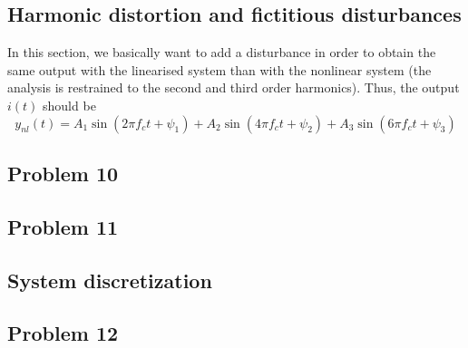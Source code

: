 \documentclass[12pt,a4paper,fleqn, onesside]{report}
\begin{document}
\subsection{Harmonic distortion and fictitious disturbances}
In this section, we basically want to add a disturbance in order to obtain the same output with the linearised system than with the nonlinear system (the analysis is restrained to the second and third order harmonics). Thus, the output $i(t)$ should be
\begin{equation}
\label{eq:output}
y_{nl}(t)=A_1\sin(2\pi f_ct+\psi_1)+A_2\sin(4\pi f_ct+\psi_2)+A_3\sin(6\pi f_ct+\psi_3)
\end{equation}

\subsection*{Problem 10}


\subsection*{Problem 11}


\subsection{System discretization}
\subsection*{Problem 12}



  \begin{thebibliography}{2}

  \end{thebibliography}
\end{document}
